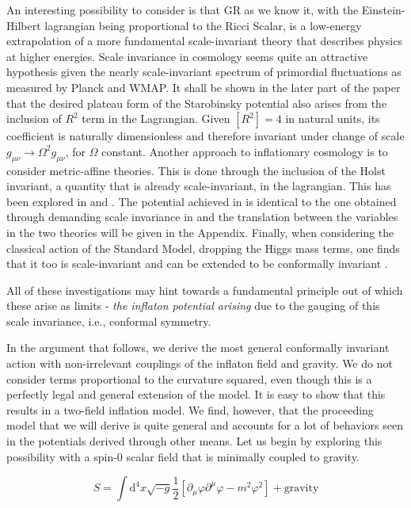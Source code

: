 \documentclass[aps,prd,reprint,preprintnumbers,showpacs,floatfix,nofootinbib,superscript address]{revtex4-2}
\begin{document}
An interesting possibility to consider is that GR as we know it, with the Einstein-Hilbert lagrangian being proportional to the Ricci Scalar, is a low-energy extrapolation of a more fundamental scale-invariant theory that describes physics at higher energies. Scale invariance in cosmology seems quite an attractive hypothesis given the nearly scale-invariant spectrum of primordial fluctuations as measured by Planck and WMAP. It shall be shown in the later part of the paper that the desired plateau form of the Starobinsky potential also arises from the inclusion of $R^2$ term in the Lagrangian. Given $[R^2] = 4$ in natural units, its coefficient is naturally dimensionless and therefore invariant under change of scale $g_{\mu\nu} \rightarrow \Omega^2 g_{\mu\nu}$, for $\Omega$ constant. Another approach to inflationary cosmology is to consider metric-affine theories. This is done through the inclusion of the Holst invariant, a quantity that is already scale-invariant, in the lagrangian. This has been explored in \cite{Salvio_2022} and \cite{pradisi2022equivalence}. The potential achieved in \cite{Salvio_2022} is identical to the one obtained through demanding scale invariance in \cite{barker2024poincaregaugetheoryconformal} and the translation between the variables in the two theories will be given in the Appendix. Finally, when considering the classical action of the Standard Model, dropping the Higgs mass terms, one finds that it too is scale-invariant and can be extended to be conformally invariant \cite{bars2014local}. 

All of these investigations may hint towards a fundamental principle out of which these arise as limits - \textit{the inflaton potential arising} due to the gauging of this scale invariance, i.e., conformal symmetry.

In the argument that follows, we derive the most general conformally invariant action with non-irrelevant couplings of the inflaton field and gravity. We do not consider terms proportional to the curvature squared, even though this is a perfectly legal and general extension of the model. It is easy to show that this results in a two-field inflation model. We find, however, that the proceeding model that we will derive is quite general and accounts for a lot of behaviors seen in the potentials derived through other means. Let us begin by exploring this possibility with a spin-0 scalar field that is minimally coupled to gravity.

\begin{equation} \label{25}
    S = \int \mathrm{d}^4 x \sqrt{-g} \frac{1}{2} \left[ \partial_\mu \varphi \partial^\mu \varphi - m^2   \varphi^2   \right] + \text{gravity}
\end{equation}
\end{document}

